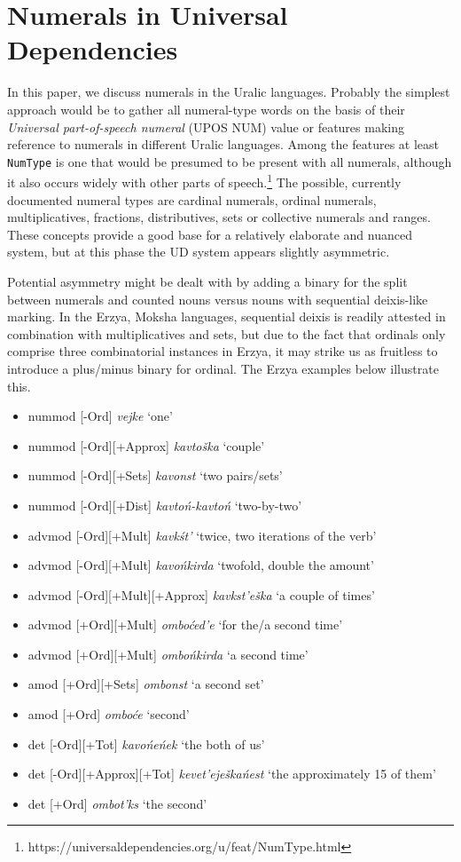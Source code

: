 \documentclass[free]{flammie}
\begin{document}
\section{Numerals in Universal Dependencies}

In this paper, we discuss numerals in the Uralic languages. Probably the
simplest approach would be to gather all numeral-type words on the basis of
their \textit{Universal part-of-speech numeral} (UPOS NUM) value or features
making reference to numerals in different Uralic languages. Among the features
at least \texttt{NumType} is one that would be presumed to be present with all
numerals, although it also occurs widely with other parts of
speech.\footnote{https://universaldependencies.org/u/feat/NumType.html} The
possible, currently documented numeral types are cardinal numerals, ordinal
numerals, multiplicatives, fractions, distributives, sets or collective numerals
and ranges. These concepts provide a good base for a relatively elaborate and
nuanced system, but at this phase the UD system appears slightly asymmetric.

Potential asymmetry might be dealt with by adding a binary for the split between
numerals and counted nouns versus nouns with sequential deixis-like marking. In
the Erzya, Moksha languages, sequential deixis is readily attested in
combination with multiplicatives and sets, but due to the fact that ordinals
only comprise three combinatorial instances in Erzya, it may strike us as
fruitless to introduce a plus/minus binary for ordinal. The Erzya examples below
illustrate this.

\begin{itemize}
\item nummod [-Ord] \textit{vejke} `one'
\item nummod [-Ord][+Approx] \textit{kavtoška} `couple'
\item nummod [-Ord][+Sets] \textit{kavonst} `two pairs/sets'
\item  nummod [-Ord][+Dist] \textit{kavtoń-kavtoń} `two-by-two'
\item  advmod [-Ord][+Mult] \textit{kavkśt'} `twice, two iterations of the verb'
\item  advmod [-Ord][+Mult] \textit{kavońkirda} `twofold, double the amount'
\item advmod [-Ord][+Mult][+Approx] \textit{kavkst'eška} `a couple of times'
\item advmod [+Ord][+Mult] \textit{omboćed'e} `for the/a second time' %
\item advmod [+Ord][+Mult] \textit{ombońkirda} `a second time'
\item amod [+Ord][+Sets] \textit{ombonst} `a second set' %
\item amod [+Ord] \textit{omboće} `second'  %
\item  det [-Ord][+Tot] \textit{kavońeńek} `the both of us' %
\item  det [-Ord][+Approx][+Tot] \textit{kevet'eješkańest} `the approximately 15 of them' %
\item det [+Ord] \textit{ombot'ks} `the second' %
\end{itemize}
\end{document}
